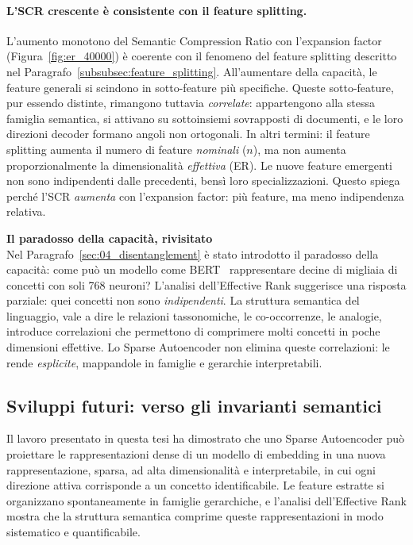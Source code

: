 \paragraph{L'SCR crescente è consistente con il feature splitting.}
L'aumento monotono del Semantic Compression Ratio con l'expansion factor (Figura~\ref{fig:er_40000}) è coerente con il fenomeno del feature splitting descritto nel Paragrafo~\ref{subsubsec:feature_splitting}. All'aumentare della capacità, le feature generali si scindono in sotto-feature più specifiche. Queste sotto-feature, pur essendo distinte, rimangono tuttavia \textit{correlate}: appartengono alla stessa famiglia semantica, si attivano su sottoinsiemi sovrapposti di documenti, e le loro direzioni decoder formano angoli non ortogonali.
In altri termini: il feature splitting aumenta il numero di feature \textit{nominali} ($n$), ma non aumenta proporzionalmente la dimensionalità \textit{effettiva} (ER). Le nuove feature emergenti non sono indipendenti dalle precedenti, bensì loro specializzazioni. Questo spiega perché l'SCR \textit{aumenta} con l'expansion factor: più feature, ma meno indipendenza relativa.
\begin{notebox}
\textbf{Il paradosso della capacità, rivisitato}\\[0.5em]
Nel Paragrafo~\ref{sec:04_disentanglement} è stato introdotto il paradosso della capacità: come può un modello come BERT~\parencite{devlin2018bert} rappresentare decine di migliaia di concetti con soli 768 neuroni?
L'analisi dell'Effective Rank suggerisce una risposta parziale: quei concetti non sono \textit{indipendenti}. La struttura semantica del linguaggio, vale a dire le relazioni tassonomiche, le co-occorrenze, le analogie, introduce correlazioni che permettono di comprimere molti concetti in poche dimensioni effettive.
Lo Sparse Autoencoder non elimina queste correlazioni: le rende \textit{esplicite}, mappandole in famiglie e gerarchie interpretabili.
\end{notebox}

\subsection{Sviluppi futuri: verso gli invarianti semantici}
\label{subsec:sviluppi_futuri}

Il lavoro presentato in questa tesi ha dimostrato che uno Sparse Autoencoder può proiettare le rappresentazioni dense di un modello di embedding in una nuova rappresentazione, sparsa, ad alta dimensionalità e interpretabile, in cui ogni direzione attiva corrisponde a un concetto identificabile. Le feature estratte si organizzano spontaneamente in famiglie gerarchiche, e l'analisi dell'Effective Rank mostra che la struttura semantica comprime queste rappresentazioni in modo sistematico e quantificabile.

